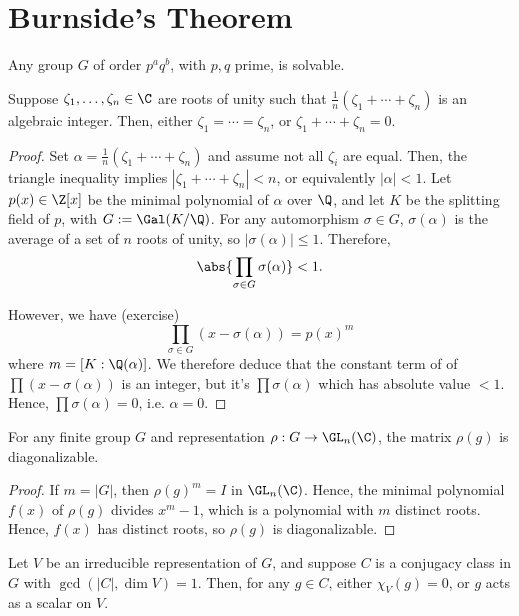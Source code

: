 \section{Burnside's Theorem}

\begin{thm}
    Any group $G$ of order $p^aq^b$, with $p,q$ prime, is solvable.
\end{thm}

\begin{lem}[][label=lem:burnlem1]
    Suppose $\zeta_1,\dots,\zeta_n \in \C$ are roots of unity such that $\frac{1}{n}(\zeta_1+\cdots + \zeta_n)$ is an algebraic integer. Then, either $\zeta_1=\cdots =\zeta_n$, or $\zeta_1+\cdots + \zeta_n=0$.
\end{lem}

\begin{proof}
    Set $\alpha = \frac{1}{n}(\zeta_1+\cdots + \zeta_n)$ and assume not all $\zeta_i$ are equal. Then, the triangle inequality implies $|\zeta_1+\cdots + \zeta_n|<n$, or equivalently $|\alpha| < 1$. Let $p(x) \in \Z[x]$ be the minimal polynomial of $\alpha$ over $\Q$, and let $K$ be the splitting field of $p$, with $G:=\Gal(K/\Q)$. For any automorphism $\sigma \in G$, $\sigma(\alpha)$ is the average of a set of $n$ roots of unity, so $|\sigma (\alpha)| \leq 1$. Therefore,
    $$\abs{\prod_{\sigma \in G}\sigma(\alpha)} <1.$$

    However, we have (exercise)
    $$\prod_{\sigma \in G}(x-\sigma(\alpha))=p(x)^m$$
    where $m=[K:\Q(\alpha)]$. We therefore deduce that the constant term of of $\prod (x-\sigma(\alpha))$ is an integer, but it's $\prod \sigma(\alpha)$ which has absolute value $<1$. Hence, $\prod \sigma(\alpha)=0$, i.e. $\alpha=0$.
\end{proof}

\begin{lem}[][label=lem:burnlem2]
    For any finite group $G$ and representation $\rho :G \to \GL_n(\C)$, the matrix $\rho(g)$ is diagonalizable.
\end{lem}

\begin{proof}
If $m=|G|$, then $\rho(g)^m=I$ in $\GL_n(\C)$. Hence, the minimal polynomial $f(x)$ of $\rho(g)$ divides $x^m-1$, which is a polynomial with $m$ distinct roots. Hence, $f(x)$ has distinct roots, so $\rho(g)$ is diagonalizable.
\end{proof}

\begin{thm}[][label=thm:burnthm1]
    Let $V$ be an irreducible representation of $G$, and suppose $C$ is a conjugacy class in $G$ with $\gcd(|C|,\dim V)=1$. Then, for any $g \in C$, either $\chi_V(g)=0$, or $g$ acts as a scalar on $V$.
\end{thm}

